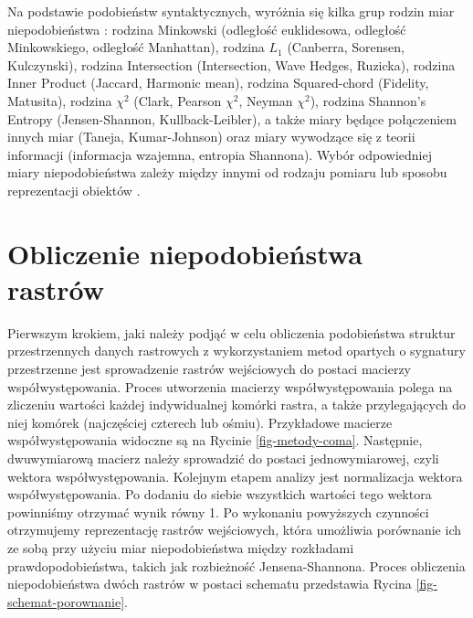 \documentclass{amuthesis}
\begin{document}
Na podstawie podobieństw syntaktycznych, wyróżnia się kilka grup rodzin
miar niepodobieństwa \autocite{Cha2007}: rodzina Minkowski (odległość
euklidesowa, odległość Minkowskiego, odległość Manhattan), rodzina
\(L_1\) (Canberra, Sorensen, Kulczynski), rodzina Intersection
(Intersection, Wave Hedges, Ruzicka), rodzina Inner Product (Jaccard,
Harmonic mean), rodzina Squared-chord (Fidelity, Matusita), rodzina
\(\chi^2\) (Clark, Pearson \(\chi^2\), Neyman \(\chi^2\)), rodzina
Shannon's Entropy (Jensen-Shannon, Kullback-Leibler), a także miary
będące połączeniem innych miar (Taneja, Kumar-Johnson) oraz miary
wywodzące się z teorii informacji (informacja wzajemna, entropia
Shannona). Wybór odpowiedniej miary niepodobieństwa zależy między innymi
od rodzaju pomiaru lub sposobu reprezentacji obiektów
\autocite{Cha2007}.

\hypertarget{obliczenie-niepodobieux144stwa-rastruxf3w}{%
\section{Obliczenie niepodobieństwa
rastrów}\label{obliczenie-niepodobieux144stwa-rastruxf3w}}

Pierwszym krokiem, jaki należy podjąć w celu obliczenia podobieństwa
struktur przestrzennych danych rastrowych z wykorzystaniem metod
opartych o sygnatury przestrzenne jest sprowadzenie rastrów wejściowych
do postaci macierzy współwystępowania. Proces utworzenia macierzy
współwystępowania polega na zliczeniu wartości każdej indywidualnej
komórki rastra, a także przylegających do niej komórek (najczęściej
czterech lub ośmiu). Przykładowe macierze współwystępowania widoczne są
na Rycinie \ref{fig-metody-coma}. Następnie, dwuwymiarową macierz należy
sprowadzić do postaci jednowymiarowej, czyli wektora współwystępowania.
Kolejnym etapem analizy jest normalizacja wektora współwystępowania. Po
dodaniu do siebie wszystkich wartości tego wektora powinniśmy otrzymać
wynik równy 1. Po wykonaniu powyższych czynności otrzymujemy
reprezentację rastrów wejściowych, która umożliwia porównanie ich ze
sobą przy użyciu miar niepodobieństwa między rozkładami
prawdopodobieństwa, takich jak rozbieżność Jensena-Shannona. Proces
obliczenia niepodobieństwa dwóch rastrów w postaci schematu przedstawia
Rycina \ref{fig-schemat-porownanie}.
\end{document}
